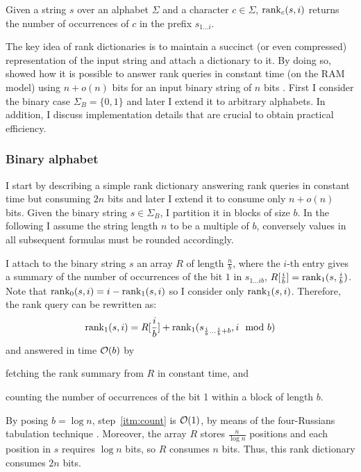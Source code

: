\begin{definition}
Given a string $s$ over an alphabet $\Sigma$ and a character $c \in \Sigma$, $\text{rank}_c(s, i)$ returns the number of occurrences of $c$ in the prefix $s_{1 \dots i}$.
\end{definition}

The key idea of rank dictionaries is to maintain a succinct (or even compressed) representation of the input string and attach a dictionary to it.
By doing so, \citeauthor{Jacobson1989} showed how it is possible to answer rank queries in constant time (on the RAM model) using $n+o(n)$ bits for an input binary string of $n$ bits \citep{Jacobson1989}.
First I consider the binary case $\Sigma_B = \{ 0, 1 \}$ and later I extend it to arbitrary alphabets.
In addition, I discuss implementation details that are crucial to obtain practical efficiency.

\subsubsection{Binary alphabet}

I start by describing a simple rank dictionary answering rank queries in constant time but consuming $2n$ bits and later I extend it to consume only $n + o(n)$ bits.
Given the binary string $s \in \Sigma_B$, I partition it in blocks of size $b$.
In the following I assume \wlogs the string length $n$ to be a multiple of $b$, conversely values in all subsequent formulas must be rounded accordingly.

I attach to the binary string $s$ an array $R$ of length $\frac{n}{b}$, where the $i$-th entry gives a summary of the number of occurrences of the bit $1$ in $s_{1 \dots i b}$, \ie $R[\frac{i}{b}] = \text{rank}_1(s, \frac{i}{b})$.
Note that $\text{rank}_0(s, i) = i - \text{rank}_1(s, i)$ so I consider only $\text{rank}_1(s, i)$.
Therefore, the rank query can be rewritten as:
\begin{eqnarray}
\text{rank}_1(s,i) = R[\frac{i}{b}] + \text{rank}_1(s_{\frac{i}{b} \dots \frac{i}{b}+b}, i \mod{b})
\end{eqnarray}
and answered in time $\mathcal{O}(b)$ by 
\begin{inparaenum}[(i)]
\item \label{itm:fetch} fetching the rank summary from $R$ in constant time, and
\item \label{itm:count} counting the number of occurrences of the bit 1 within a block of length $b$.
\end{inparaenum}
By posing $b=\log{n}$, step~\ref{itm:count} is $\mathcal{O}(1)$, by means of the four-Russians tabulation technique \citep{Arlazarov1975}.
Moreover, the array $R$ stores $\frac{n}{\log{n}}$ positions and each position in $s$ requires $\log{n}$ bits, so $R$ consumes $n$ bits.
Thus, this rank dictionary consumes $2n$ bits.


